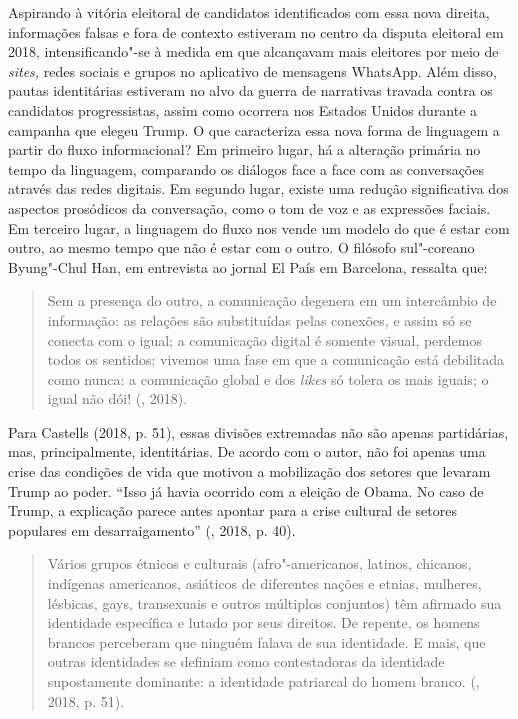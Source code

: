 Aspirando à vitória eleitoral de candidatos identificados com essa nova
direita, informações falsas e fora de contexto estiveram no centro da
disputa eleitoral em 2018, intensificando"-se à medida em que alcançavam
mais eleitores por meio de \emph{sites,} redes sociais e grupos no
aplicativo de mensagens WhatsApp. Além disso, pautas identitárias
estiveram no alvo da guerra de narrativas travada contra os candidatos
progressistas, assim como ocorrera nos Estados Unidos durante a campanha
que elegeu Trump. O que caracteriza essa nova forma de linguagem a
partir do fluxo informacional? Em primeiro lugar, há a alteração
primária no tempo da linguagem, comparando os diálogos face a face com
as conversações através das redes digitais. Em segundo lugar, existe uma
redução significativa dos aspectos prosódicos da conversação, como o tom
de voz e as expressões faciais. Em terceiro lugar, a linguagem do fluxo
nos vende um modelo do que é estar com outro, ao mesmo tempo que não é
estar com o outro. O filósofo sul"-coreano Byung"-Chul Han, em entrevista
ao jornal El País em Barcelona, ressalta que:

\begin{quote}
Sem a presença do outro, a comunicação degenera em um intercâmbio de
informação: as relações são substituídas pelas conexões, e assim só se
conecta com o igual; a comunicação digital é somente visual, perdemos
todos os sentidos; vivemos uma fase em que a comunicação está debilitada
como nunca: a comunicação global e dos \emph{likes} só tolera os mais
iguais; o igual não dói! (, 2018).
\end{quote}

Para Castells (2018, p. 51), essas divisões extremadas não são apenas
partidárias, mas, principalmente, identitárias. De acordo com o autor,
não foi apenas uma crise das condições de vida que motivou a mobilização
dos setores que levaram Trump ao poder. ``Isso já havia ocorrido com a
eleição de Obama. No caso de Trump, a explicação parece antes apontar
para a crise cultural de setores populares em desarraigamento''
(, 2018, p. 40).

\begin{quote}
Vários grupos étnicos e culturais (afro"-americanos, latinos, chicanos,
indígenas americanos, asiáticos de diferentes nações e etnias, mulheres,
lésbicas, gays, transexuais e outros múltiplos conjuntos) têm afirmado
sua identidade específica e lutado por seus direitos. De repente, os
homens brancos perceberam que ninguém falava de sua identidade. E mais,
que outras identidades se definiam como contestadoras da identidade
supostamente dominante: a identidade patriarcal do homem branco.
(, 2018, p. 51).
\end{quote}

